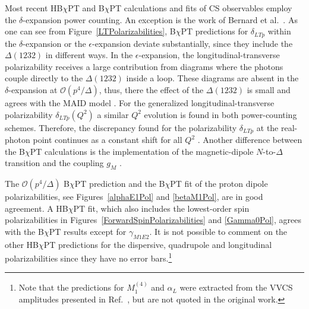 \documentclass[preprints,review,accept,moreauthors,pdftex]{Definitions/mdpi}
\def\al{\alpha}
\def\ga{\gamma} \def\Ga{{\it\Gamma}}
\def\de{\delta} \def\De{\Delta}
\begin{document}
Most recent HB$\chi$PT \cite{McGovern:2012ew,Griesshammer:2012we,Griesshammer:2015ahu} and B$\chi$PT \cite{Lensky:2008re,Lensky:2009uv,Lensky:2014efa, Lensky:2014dda,Lensky:2015awa,Lensky:2016nui,Alarcon:2020wjg, Alarcon:2020icz} calculations and fits of
CS observables employ the 
$\de$-expansion power counting. An exception is the work of Bernard et al.\ \cite{Bernard:2012hb}. As one can see from Figure~\ref{LTPolarizabilities}, B$\chi$PT predictions for $\delta_{LTp}$ within the $\delta$-expansion \cite{Lensky:2014dda,Alarcon:2020icz} or the $\epsilon$-expansion \cite{Bernard:2012hb} deviate substantially, since they include the $\Delta(1232)$ in different ways. In the $\epsilon$-expansion, the longitudinal-transverse polarizability receives a large contribution from diagrams where the photons couple directly to the $\Delta(1232)$ inside a loop. These diagrams are absent in the $\delta$-expansion at $\mathcal{O}(p
^4/\varDelta)$, thus, there the effect of the $\Delta(1232)$ is small and agrees with the MAID model \cite{MAID}. For the generalized longitudinal-transverse polarizability $\delta_{LTp}(Q^2)$ a similar $Q^2$ evolution is found in both power-counting schemes. Therefore, the discrepancy found for the polarizability  $\delta_{LTp}$ at the real-photon point continues as a constant shift for all $Q^2$ \cite{Alarcon:2020icz}. Another difference between the B$\chi$PT calculations
\cite{Lensky:2015awa,Alarcon:2020icz,Bernard:2012hb} is the implementation of the magnetic-dipole $N$-to-$\Delta$ transition and the coupling $g_M$ \cite{Krebs:2019ddp}.

The $\mathcal{O}(p^4/\Delta)$ B$\chi$PT prediction \cite{Lensky:2015awa} and the B$\chi$PT fit \cite{Lensky:2014efa} of the proton dipole polarizabilities, see Figures~\ref{alphaE1Pol} and \ref{betaM1Pol}, are in good agreement. A HB$\chi$PT fit, which also includes the lowest-order spin polarizabilities in Figures~\ref{ForwardSpinPolarizabilities} and \ref{Gamma0Pol}, agrees with the B$\chi$PT results \cite{Lensky:2015awa,Lensky:2014efa} except for $\ga_{M1E2}$. It is not possible to comment on the other HB$\chi$PT predictions for the dispersive, quadrupole and longitudinal polarizabilities \cite{Knoechlein97,Nevado:2007dd} since they have no error bars.\footnote{Note that the predictions for $M_1
^{(4)}$ and $\al_L$ were extracted from the VVCS amplitudes presented in Ref.~\cite{Nevado:2007dd}, but are not quoted in the original work.}
 
\end{document}
